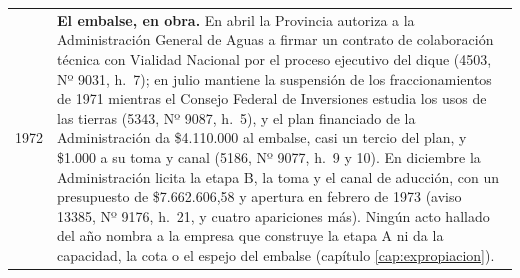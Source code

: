 \begin{longtable}{@{}p{2.7cm}p{10.3cm}@{}}
1972 & \textbf{El embalse, en obra.} En abril la Provincia autoriza a la Administración General de Aguas a firmar un contrato de colaboración técnica con Vialidad Nacional por el proceso ejecutivo del dique (4503, Nº 9031, h.\ 7); en julio mantiene la suspensión de los fraccionamientos de 1971 mientras el Consejo Federal de Inversiones estudia los usos de las tierras (5343, Nº 9087, h.\ 5), y el plan financiado de la Administración da \$4.110.000 al embalse, casi un tercio del plan, y \$1.000 a su toma y canal (5186, Nº 9077, h.\ 9 y 10). En diciembre la Administración licita la etapa B, la toma y el canal de aducción, con un presupuesto de \$7.662.606,58 y apertura en febrero de 1973 (aviso 13385, Nº 9176, h.\ 21, y cuatro apariciones más). Ningún acto hallado del año nombra a la empresa que construye la etapa A ni da la capacidad, la cota o el espejo del embalse (capítulo \ref{cap:expropiacion}). \\

\end{longtable}
